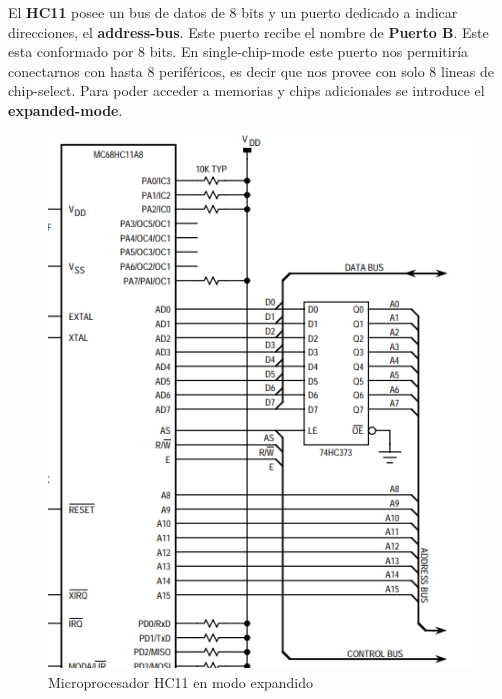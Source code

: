 El \textbf{HC11} posee un bus de datos de 8 bits y un puerto dedicado a indicar direcciones, el \textbf{address-bus}. Este puerto recibe el nombre de \textbf{Puerto B}. Este esta conformado por 8 bits. En single-chip-mode este puerto nos permitiría conectarnos con hasta 8 periféricos, es decir que nos provee con solo 8 lineas de chip-select.  Para poder acceder a memorias y chips adicionales se introduce el \textbf{expanded-mode}.
\begin{figure}[H]
	\centering
	\includegraphics[scale=0.5]{ImagenesEjercicio3/MicroHC11ExpandedMode.PNG}
	\caption{Microprocesador HC11 en modo expandido}
	\label{fig:microhc11}
\end{figure}

